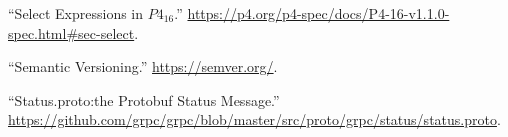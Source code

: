 \documentclass[11pt]{article}
\begin{document}
{{\begin{thebibliography}{36}
\mdbibitemlabel{{}[25]}\textquotedblleft{}Select Expressions in $P4_{16}$.\textquotedblright{} \href{https://p4.org/p4-spec/docs/P4-16-v1.1.0-spec.html\%23sec-select}{{\ttfamily https://\hspace{0pt}p4.\hspace{0pt}org/\hspace{0pt}p4-\hspace{0pt}spec/\hspace{0pt}docs/\hspace{0pt}P4-\hspace{0pt}16-\hspace{0pt}v1.\hspace{0pt}1.\hspace{0pt}0-\hspace{0pt}spec.\hspace{0pt}html\#\hspace{0pt}sec-\hspace{0pt}select}}.\label{p4selectexpr}%

\mdbibitemlabel{{}[26]}\textquotedblleft{}Semantic Versioning.\textquotedblright{} \href{https://semver.org/}{{\ttfamily https://\hspace{0pt}semver.\hspace{0pt}org/\hspace{0pt}}}.\label{semver}%

\mdbibitemlabel{{}[27]}\textquotedblleft{}Status.proto:the Protobuf Status Message.\textquotedblright{} \href{https://github.com/grpc/grpc/blob/master/src/proto/grpc/status/status.proto}{{\ttfamily https://\hspace{0pt}github.\hspace{0pt}com/\hspace{0pt}grpc/\hspace{0pt}grpc/\hspace{0pt}blob/\hspace{0pt}master/\hspace{0pt}src/\hspace{0pt}proto/\hspace{0pt}grpc/\hspace{0pt}status/\hspace{0pt}status.\hspace{0pt}proto}}.\label{protostatus}%


\end{thebibliography}}}
\end{document}
